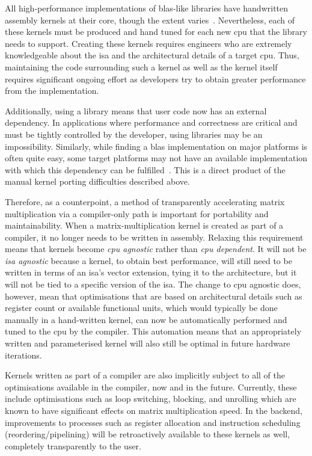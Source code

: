 \documentclass[\main/thesis.tex]{subfiles}
\begin{document}
All high-performance implementations of \gls{blas}-like libraries have handwritten assembly kernels at their core, though the extent varies~\autocite{zee2016blis}.
Nevertheless, each of these kernels must be produced and hand tuned for each new \gls{cpu} that the library needs to support.
Creating these kernels requires engineers who are extremely knowledgeable about the \gls{isa} and the architectural details of a target \gls{cpu}.
Thus, maintaining the code surrounding such a kernel as well as the kernel itself requires significant ongoing effort as developers try to obtain greater performance from the implementation.

Additionally, using a library means that user code now has an external dependency.
In applications where performance and correctness are critical and must be tightly controlled by the developer, using libraries may be an impossibility.
Similarly, while finding a \gls{blas} implementation on major platforms is often quite easy, some target platforms may not have an available implementation with which this dependency can be fulfilled~\autocite{zee2016blis}.
This is a direct product of the manual kernel porting difficulties described above.

Therefore, as a counterpoint, a method of transparently accelerating matrix multiplication via a compiler-only path is important for portability and maintainability.
When a matrix-multiplication kernel is created as part of a compiler, it no longer needs to be written in assembly.
Relaxing this requirement means that kernels become \emph{\gls{cpu} agnostic} rather than \emph{\gls{cpu} dependent}.
It will not be \emph{\gls{isa} agnostic} because a kernel, to obtain best performance, will still need to be written in terms of an \gls{isa}'s vector extension, tying it to the architecture, but it will not be tied to a specific version of the \gls{isa}.
The change to \gls{cpu} agnostic does, however, mean that  optimisations that are based on architectural details such as register count or available functional units, which would typically be done manually in a hand-written kernel, can now be automatically performed and tuned to the \gls{cpu} by the compiler.
This automation means that an appropriately written and parameterised kernel will also still be optimal in future hardware iterations.

Kernels written as part of a compiler are also implicitly subject to all of the optimisations available in the compiler, now and in the future.
Currently, these include optimisations such as loop switching, blocking, and unrolling which are known to have significant effects on matrix multiplication speed.
In the backend, improvements to processes such as register allocation and instruction scheduling (reordering/pipelining) will be retroactively available to these kernels as well, completely transparently to the user.
\end{document}
